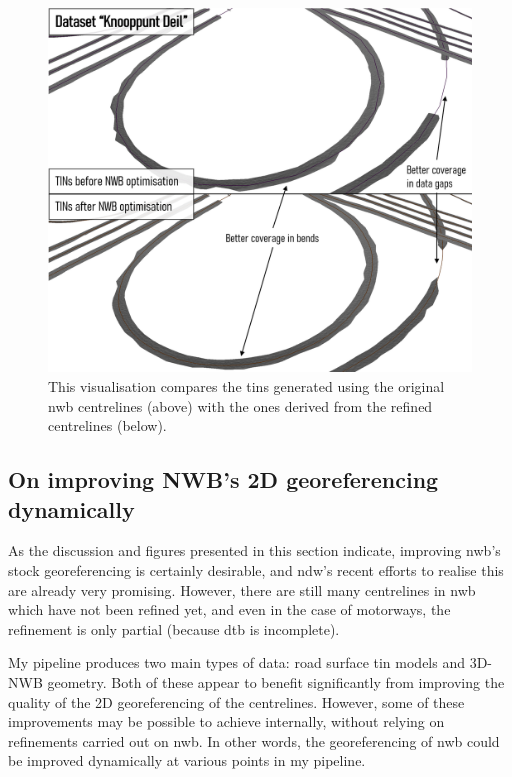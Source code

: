 \begin{figure}
    \centering
    \includegraphics[width=0.8\linewidth]{final_report/figs/nwb_updated_tinconstruction.png}
    \caption[Visualisation of the effects of improving NWB on the TINs]{This visualisation compares the \ac{tin}s generated using the original \ac{nwb} centrelines (above) with the ones derived from the refined centrelines (below).}
    \label{fig:nwb_updated_tinconstructionn}
\end{figure}

\subsection{On improving NWB's 2D georeferencing dynamically}
\label{sub:nwb_updated_dynamic}

As the discussion and figures presented in this section indicate, improving \ac{nwb}'s stock georeferencing is certainly desirable, and \ac{ndw}'s recent efforts to realise this are already very promising. However, there are still many centrelines in \ac{nwb} which have not been refined yet, and even in the case of motorways, the refinement is only partial (because \ac{dtb} is incomplete).

My pipeline produces two main types of data: road surface \ac{tin} models and 3D-NWB geometry. Both of these appear to benefit significantly from improving the quality of the 2D georeferencing of the centrelines. However, some of these improvements may be possible to achieve internally, without relying on refinements carried out on \ac{nwb}. In other words, the georeferencing of \ac{nwb} could be improved dynamically at various points in my pipeline.

